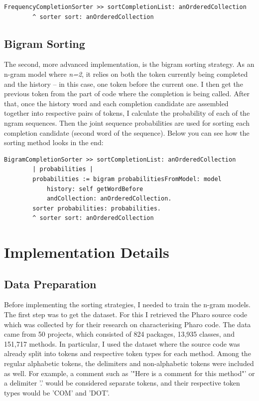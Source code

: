 \begin{lstlisting}[caption={The unigram sorter implementation: returning the results sorted in the code above}, label={lst:unigramCode3}]
    FrequencyCompletionSorter >> sortCompletionList: anOrderedCollection
        ^ sorter sort: anOrderedCollection
\end{lstlisting}

\subsection{Bigram Sorting}
The second, more advanced implementation, is the bigram sorting strategy. As an n-gram model where \textit{n=2}, it relies on both the token currently being completed and the history -- in this case, one token before the current one. I then get the previous token from the part of code where the completion is being called. After that, once the history word and each completion candidate are assembled together into respective pairs of tokens, I calculate the probability of each of the ngram sequences. Then the joint sequence probabilities are used for sorting each completion candidate (second word of the sequence). Below you can see how the sorting method looks in the end:

\begin{lstlisting}[caption={The bigram sorter implementation: receives the list of completions, gets the word before from context, trains the model, and sorts the completions based on sequence probabilities}, label={lst:bigramCode}]
    BigramCompletionSorter >> sortCompletionList: anOrderedCollection
        | probabilities |
        probabilities := bigram probabilitiesFromModel: model
            history: self getWordBefore
            andCollection: anOrderedCollection.
        sorter probabilities: probabilities.
        ^ sorter sort: anOrderedCollection
\end{lstlisting}

\section{Implementation Details}
\label{sec:ProposedSolution-Implementation}
\subsection{Data Preparation}
Before implementing the sorting strategies, I needed to train the n-gram models. The first step was to get the dataset. For this I retrieved the Pharo source code which was collected by \cite{Zait20a} for their research on characterising Pharo code. The data came from 50 projects, which consisted of 824 packages, 13,935 classes, and 151,717 methods. In particular, I used the dataset where the source code was already split into tokens and respective token types for each method. Among the regular alphabetic tokens, the delimiters and non-alphabetic tokens were included as well. For example, a comment such as '"Here is a comment for this method"' or a delimiter '.' would be considered separate tokens, and their respective token types would be 'COM' and 'DOT'.

